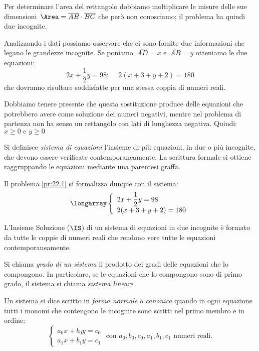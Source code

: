 Per determinare l'area del rettangolo dobbiamo moltiplicare le misure 
delle sue dimensioni~$\Area=\overline{AB}\cdot\overline{BC}$
che però non conosciamo; il problema ha quindi due incognite.

Analizzando i dati possiamo osservare che ci sono fornite due
informazioni che legano le grandezze incognite. 
Se poniamo~$\overline{AD}=x$ e~$\overline{AB}=y$
otteniamo le due equazioni:
\[2x+\frac{1}{2}y=98;\quad~2(x+3+y+2)=180\]
che dovranno risultare soddisfatte per una stessa coppia di numeri
reali.

\begin{osservazione}
 Dobbiamo tenere presente che questa sostituzione produce delle equazioni 
 che potrebbero avere come soluzione dei numeri negativi, mentre nel problema 
 di partenza non ha senso un rettangolo con lati di lunghezza negativa.
 Quindi:~$x \geqslant 0 \text{ e } y \geqslant 0$
\end{osservazione}

\begin{definizione}
Si definisce \emph{sistema di equazioni} l'insieme di più equazioni, 
in due o più incognite,
che devono essere verificate contemporaneamente. La scrittura formale
si ottiene raggruppando le equazioni mediante una parentesi graffa.
\end{definizione}

Il problema \ref{pr:22.1} si formalizza dunque con il sistema:
\[\longarray\left\{\begin{array}{l}
 2x+\dfrac{1}{2}y=98 \\
 2(x+3+y+2)=180
\end{array}\right.\]

\begin{definizione}
L'Insieme Soluzione ($\IS$) di un sistema di equazioni in
due incognite è formato da tutte le coppie di numeri reali
che rendono vere tutte le equazioni
contemporaneamente.
\end{definizione}

\begin{definizione}
Si chiama \emph{grado di un sistema} il prodotto dei gradi delle
equazioni che lo compongono. In particolare, se le equazioni che lo
compongono sono di primo grado, il sistema si chiama \emph{sistema lineare}.
\end{definizione}

\begin{definizione}
Un sistema si dice scritto in \emph{forma normale} o \emph{canonica} 
quando in ogni equazione tutti i monomi che contengono le incognite sono 
scritti nel primo membro e in ordine:
\[\left\{\begin{array}{l}
 a_{0}x+b_{0}y=c_{0} \\
 a_{1}x+b_{1}y=c_{1} 
\end{array}\right.
\text{ con }a_{0}, b_{0}, c_{0}, a_{1}, b_{1}, c_{1}\text{ numeri reali.}\]
\end{definizione}

